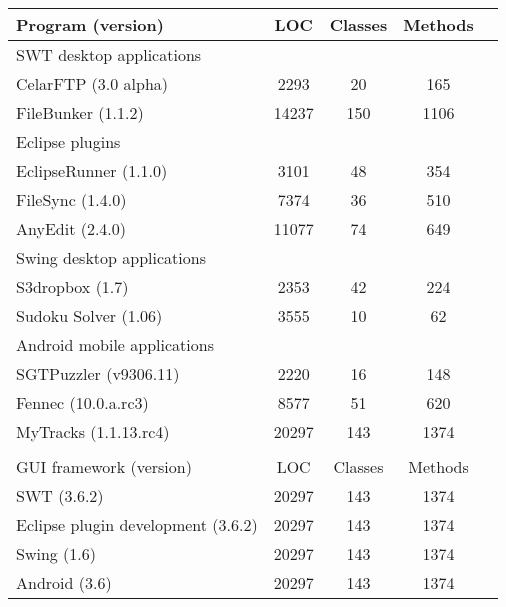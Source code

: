 \begin{table}[t]
\begin{center}
 \fontsize{9pt}{\baselineskip}\selectfont
\hspace*{-0.2cm}
\begin{tabular}{|p{4.4cm}||c|c|c|c|}
\hline
 Program (version) & LOC & Classes & Methods \\
\hline \hline
\multicolumn{4}{|l|}{SWT desktop applications}   \\
 \hline
 CelarFTP (3.0 alpha) &  2293 &  20 &  165  \\
 \hline
 FileBunker (1.1.2)&  14237 &  150 &  1106  \\
 \hline
 \hline
\multicolumn{4}{|l|}{Eclipse plugins}   \\
 \hline
 EclipseRunner (1.1.0) &  3101 &  48 &  354\\
 \hline
 FileSync (1.4.0)&  7374 &  36 &  510 \\
 \hline
 AnyEdit (2.4.0)&  11077 &  74 &  649 \\
 \hline
 \hline
\multicolumn{4}{|l|}{Swing desktop applications}   \\
 \hline
 S3dropbox (1.7) &  2353 &  42  &  224 \\
 \hline
 Sudoku Solver (1.06)&  3555 &  10 &  62 \\
 \hline
 \hline
\multicolumn{4}{|l|}{Android mobile applications}   \\
 \hline
 SGTPuzzler (v9306.11)&  2220 &  16 &  148 \\
 \hline
 Fennec (10.0.a.rc3)&  8577 &  51 &  620 \\
 \hline
 MyTracks (1.1.13.rc4)&  20297 &  143 &  1374 \\
\hline
\multicolumn{4}{l}{}   \\
\hline
 GUI framework (version) & LOC & Classes & Methods  \\
\hline \hline
 SWT (3.6.2)&  20297 &  143 &  1374  \\
\hline
 Eclipse plugin development (3.6.2)&  20297 &  143 &  1374  \\
\hline
Swing (1.6)&  20297 &  143 &  1374  \\
\hline
 Android (3.6)&  20297 &  143 &  1374  \\
\hline
\end{tabular}

\end{center}
\vspace{-15pt}
\end{table}


